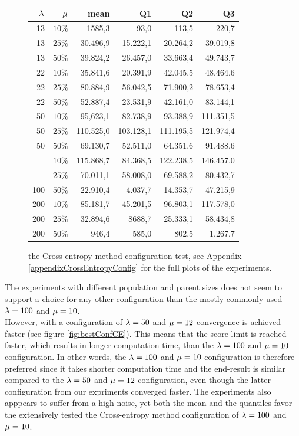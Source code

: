 \begin{figure}[H]
\centering
\begin{tabular}{r r | r r r r}
$\lambda$ & $\mu$ & mean & Q1 & Q2 & Q3\\
\hline
13 & $10\%$  & 1585,3     & 93,0      & 113,5        & 220,7\\
13 & $25\%$  & 30.496,9   & 15.222,1  & 20.264,2     & 39.019,8\\
13 & $50\%$  & 39.824,2   & 26.457,0  & 33.663,4     & 49.743,7\\
22 & $10\%$  & 35.841,6   & 20.391,9  & 42.045,5     & 48.464,6\\
22 & $25\%$  & 80.884,9   & 56.042,5  & 71.900,2     & 78.653,4\\
22 & $50\%$  & 52.887,4   & 23.531,9  & 42.161,0     & 83.144,1\\
50 & $10\%$  & 95,623,1   & 82.738,9  & 93.388,9     & 111.351,5\\
50 & $25\%$  & 110.525,0  & 103.128,1 & 111.195,5    & 121.974,4\\
50 & $50\%$  & 69.130,7   & 52.511,0  & 64.351,6     & 91.488,6\\
\hdashline
100 & $10\%$ & 115.868,7  & 84.368,5  & 122.238,5    & 146.457,0\\
\hdashline
100 & $25\%$ & 70.011,1   & 58.008,0  & 69.588,2     & 80.432,7\\
100 & $50\%$ & 22.910,4   & 4.037,7   & 14.353,7     & 47.215,9\\
200 & $10\%$ & 85.181,7   & 45.201,5  & 96.803,1     & 117.578,0\\
200 & $25\%$ & 32.894,6   & 8688,7    & 25.333,1     & 58.434,8\\
200 & $50\%$ & 946,4      & 585,0     & 802,5        & 1.267,7
\end{tabular}
\caption{the Cross-entropy method configuration test, 
see Appendix \ref{appendixCrossEntropyConfig} for the full plots 
of the experiments.  \label{CEConfigTest}}
\end{figure}

The experiments with different population and parent sizes
does not seem to support a choice for any other configuration 
than the mostly commonly used 
$\lambda = 100$ and $\mu = 10$. \\
However, with a configuration of $\lambda = 50$ and $\mu = 12$ convergence
is achieved faster (see figure \ref{fig:bestConfCE}). This means that the score limit is reached faster, which
results in longer computation time, than the $\lambda = 100$ and $\mu = 10$
configuration. In other words, the $\lambda = 100$ and $\mu = 10$ configuration 
is therefore preferred since it takes shorter computation time and the end-result is similar compared
to the $\lambda = 50$ and $\mu = 12$ configuration, even though the latter 
configuration from our expriments converged faster. The experiments also apppears
to suffer from a high noise, yet both the mean and the quantiles favor the 
extensively tested the Cross-entropy method configuration of $\lambda = 100$ and $\mu = 10$.

